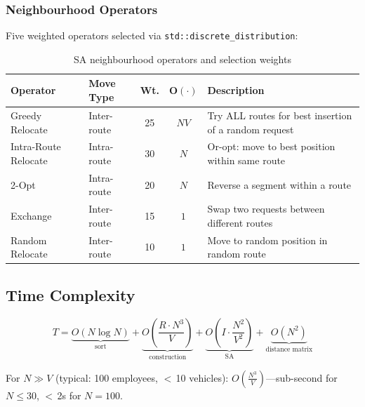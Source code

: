 \documentclass[11pt,a4paper]{article}
\newcommand{\code}[1]{\texttt{#1}}
\begin{document}
\subsubsection{Neighbourhood Operators}

Five weighted operators selected via \code{std::discrete\_distribution}:

\begin{table}[H]
\centering
\caption{SA neighbourhood operators and selection weights}
\label{tab:operators}
\small
\begin{tabular}{llccp{5cm}}
\toprule
\textbf{Operator} & \textbf{Move Type} & \textbf{Wt.} & \textbf{$\boldsymbol{O(\cdot)}$} & \textbf{Description} \\
\midrule
\rowcolor{rowalt}
Greedy Relocate & Inter-route & 25 & $NV$ & Try ALL routes for best insertion of a random request \\
Intra-Route Relocate & Intra-route & 30 & $N$ & Or-opt: move to best position within same route \\
\rowcolor{rowalt}
2-Opt & Intra-route & 20 & $N$ & Reverse a segment within a route \\
Exchange & Inter-route & 15 & $1$ & Swap two requests between different routes \\
\rowcolor{rowalt}
Random Relocate & Inter-route & 10 & $1$ & Move to random position in random route \\
\bottomrule
\end{tabular}
\end{table}

\subsection{Time Complexity}

\[
T = \underbrace{O(N \log N)}_{\text{sort}}
  + \underbrace{O\!\left(\frac{R \cdot N^3}{V}\right)}_{\text{construction}}
  + \underbrace{O\!\left(I \cdot \frac{N^2}{V^2}\right)}_{\text{SA}}
  + \underbrace{O(N^2)}_{\text{distance matrix}}
\]

\begin{resultbox}
For $N \gg V$ (typical: 100 employees, $<$\,10 vehicles):\quad
$\displaystyle\boxed{O\!\left(\frac{N^3}{V}\right)}$\quad---\quad sub-second for $N \le 30$, $<$\,2s for $N = 100$.
\end{resultbox}

\end{document}
